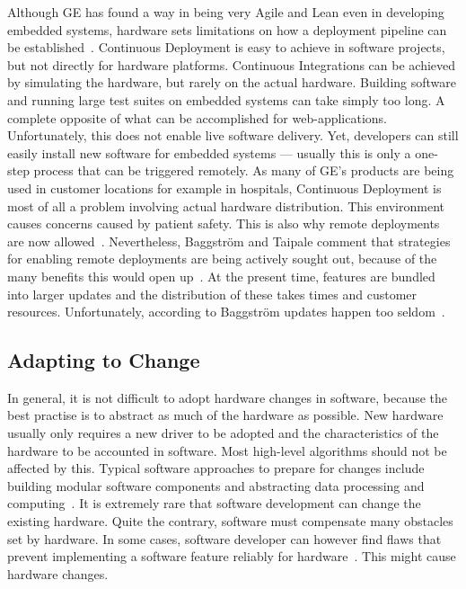 \documentclass[english]{tktltiki2}
\begin{document}
Although GE has found a way in being very Agile and Lean even in developing embedded systems, hardware sets limitations on how a deployment pipeline can be established~\cite{BT15}. Continuous Deployment is easy to achieve in software projects, but not directly for hardware platforms. Continuous Integrations can be achieved by simulating the hardware, but rarely on the actual hardware. Building software and running large test suites on embedded systems can take simply too long. A complete opposite of what can be accomplished for web-applications. Unfortunately, this does not enable live software delivery. Yet, developers can still easily install new software for embedded systems — usually this is only a one-step process that can be triggered remotely. As many of GE’s products are being used in customer locations for example in hospitals, Continuous Deployment is most of all a problem involving actual hardware distribution. This environment causes concerns caused by patient safety. This is also why remote deployments are now allowed~\cite{BT15}. Nevertheless, Baggström and Taipale comment that strategies for enabling remote deployments are being actively sought out, because of the many benefits this would open up~\cite{BT15}. At the present time, features are bundled into larger updates and the distribution of these takes times and customer resources. Unfortunately, according to Baggström updates happen too seldom~\cite{BT15}.

\subsection{Adapting to Change}

In general, it is not difficult to adopt hardware changes in software, because the best practise is to abstract as much of the hardware as possible. New hardware usually only requires a new driver to be adopted and the characteristics of the hardware to be accounted in software. Most high-level algorithms should not be affected by this. Typical software approaches to prepare for changes include building modular software components and abstracting data processing and computing~\cite{BT15, Hol15a, Hol15b, Koi15, Kri15, Pet15}. It is extremely rare that software development can change the existing hardware. Quite the contrary, software must compensate many obstacles set by hardware. In some cases, software developer can however find flaws that prevent implementing a software feature reliably for hardware~\cite{Hol15b}. This might cause hardware changes.
\end{document}
